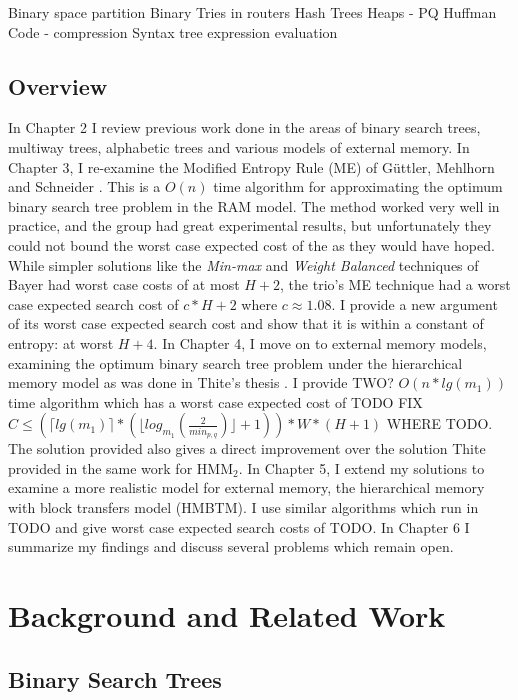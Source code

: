 \documentclass[letterpaper,12pt,titlepage,oneside,final]{book}
\theoremstyle{plain}
\begin{document}
Binary space partition
Binary Tries in routers
Hash Trees
Heaps - PQ
Huffman Code - compression
Syntax tree
expression evaluation

\section{Overview}

In Chapter 2 I review previous work done in the areas of binary search trees, multiway trees, alphabetic trees and various models of external memory. In Chapter 3, I re-examine the Modified Entropy Rule (ME) of G{\"u}ttler, Mehlhorn and Schneider \cite{guttler1980binary}. This is a $O(n)$ time algorithm for approximating the optimum binary search tree problem in the RAM model. The method worked very well in practice, and the group had great experimental results, but unfortunately they could not bound the worst case expected cost of the as they would have hoped. While simpler solutions like the \textit{Min-max} and \textit{Weight Balanced} techniques of Bayer \cite{bayer1975improved} had worst case costs of at most $H+2$, the trio's ME technique had a worst case expected search cost of $c*H+2$ where $c \approx 1.08$. I provide a new argument of its worst case expected search cost and show that it is within a constant of entropy: at worst $H+4$. In Chapter 4, I move on to external memory models, examining the optimum binary search tree problem under the hierarchical memory model as was done in Thite's thesis \cite{thite2008optimum}. I provide TWO? $O(n*lg(m_1))$ time algorithm which has a worst case expected cost of TODO FIX $C \leq (\lceil lg(m_1) \rceil * (\lfloor log_{m_1}(\frac{2}{min_{p,q}}) \rfloor + 1)) * W * (H + 1)$ WHERE TODO. The solution provided also gives a direct improvement over the solution Thite provided in the same work for HMM$_2$. In Chapter 5, I extend my solutions to examine a more realistic model for external memory, the hierarchical memory with block transfers model (HMBTM). I use similar algorithms which run in TODO and give worst case expected search costs of TODO. In Chapter 6 I summarize my findings and discuss several problems which remain open.


\chapter{Background and Related Work}



\section{Binary Search Trees}
\end{document}

